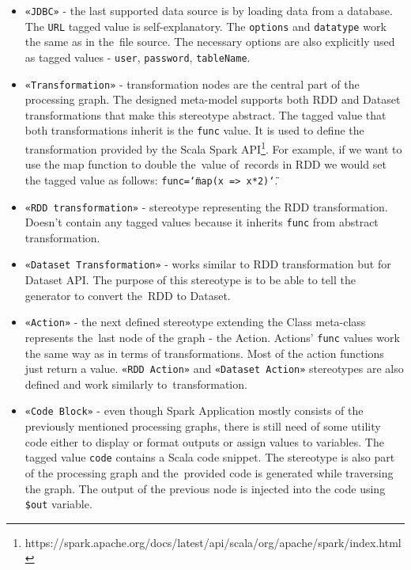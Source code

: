 \begin{itemize}
\item \texttt{«JDBC»} - the last supported data source is by loading data from a database. The \texttt{URL} tagged value is self-explanatory. The \texttt{options} and \texttt{datatype} work the same as in the~file source. The necessary options are also explicitly used as tagged values - \texttt{user}, \texttt{password}, \texttt{tableName}.


\item \texttt{«Transformation»} - transformation nodes are the central part of the processing graph. The designed meta-model supports both RDD and Dataset transformations that make this stereotype abstract. The tagged value that both transformations inherit is the \texttt{func} value. It is used to define the transformation provided by the Scala Spark API\footnote{https://spark.apache.org/docs/latest/api/scala/org/apache/spark/index.html}. For example, if we want to use the map function to double the~value of~records in RDD we would set the tagged value as follows: \texttt{func=\char`\"map(x => x*2)\char`\"}. 


\item \texttt{«RDD transformation»} - stereotype representing the RDD transformation. Doesn't contain any tagged values because it inherits \texttt{func} from abstract transformation.

\item \texttt{«Dataset Transformation»} - works similar to RDD transformation but for Dataset API. The purpose of this stereotype is to be able to tell the generator to convert the~RDD to Dataset.

\item \texttt{«Action»} - the next defined stereotype extending the Class meta-class represents the~last node of the graph - the Action. Actions' \texttt{func} values work the same way as in terms of transformations. Most of the action functions just return a value. \texttt{«RDD Action»} and \texttt{«Dataset Action»} stereotypes are also defined and work similarly to~transformation.

\item \texttt{«Code Block»} - even though Spark Application mostly consists of the previously mentioned processing graphs, there is still need of some utility code either to display or format outputs or assign values to variables. The tagged value \texttt{code} contains a Scala code snippet. The stereotype is also part of the processing graph and the~provided code is generated while traversing the graph. The output of the previous node is injected into the code using \texttt{\$out} variable.


\end{itemize}
